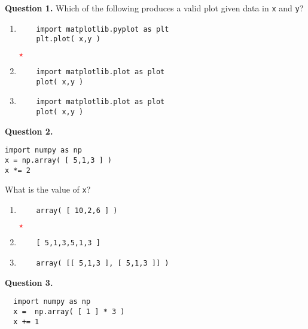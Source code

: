 \documentclass[12pt]{article}
\newcommand{\correctstar}{{\Large\textcolor{red}{$\star$}}}
\begin{document}
\bigskip

\bigskip

{\bf Question 1.}     
Which of the following produces a valid plot given data in \texttt{x} and \texttt{y}?

   \begin{enumerate}[label=\Alph*]
   	\item
   	\begin{Verbatim}
	import matplotlib.pyplot as plt
	plt.plot( x,y )
   	\end{Verbatim}
   	\correctstar
   	\item
   	\begin{Verbatim}
	import matplotlib.plot as plot
	plot( x,y )
   	\end{Verbatim}
   	\item
   	\begin{Verbatim}
	import matplotlib.plot as plot
	plot( x,y )
   	\end{Verbatim}
   \end{enumerate}

\bigskip

{\bf Question 2.}     \begin{Verbatim}
import numpy as np
x = np.array( [ 5,1,3 ] )
x *= 2
\end{Verbatim}

What is the value of \texttt{x}?

\begin{enumerate}[label=\Alph*]
	\item
	\begin{Verbatim}
	array( [ 10,2,6 ] )
	\end{Verbatim}
	\correctstar
	\item
	\begin{Verbatim}
	[ 5,1,3,5,1,3 ]
	\end{Verbatim}
	\item
	\begin{Verbatim}
	array( [[ 5,1,3 ], [ 5,1,3 ]] )
	\end{Verbatim}
\end{enumerate}

\bigskip

{\bf Question 3.} 
  \begin{Verbatim}
  import numpy as np
  x =  np.array( [ 1 ] * 3 )
  x += 1
  \end{Verbatim}
  
\end{document}

